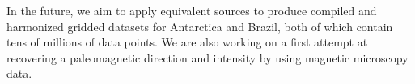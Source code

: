 \documentclass[10pt,a4paper,oneside]{book}
\begin{document}
In the future, we aim to apply equivalent sources to produce compiled and
harmonized gridded datasets for Antarctica and Brazil, both of which contain
tens of millions of data points.
We are also working on a first attempt at recovering a paleomagnetic direction
and intensity by using magnetic microscopy data.




\end{document}
